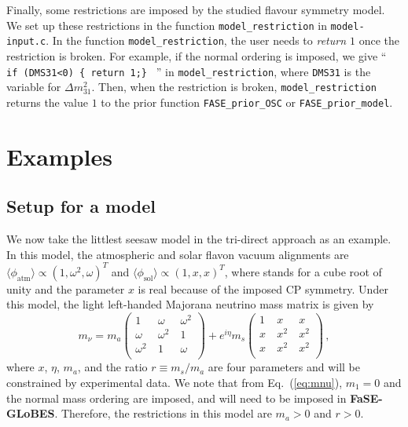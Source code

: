 \documentclass[aps,prd,nofootinbib,preprint]{revtex4}
\begin{document}
Finally, some restrictions are imposed by the studied flavour symmetry model. We set up these restrictions in the function \texttt{model\_restriction} in \texttt{model-input.c}. In the function \texttt{model\_restriction}, the user needs to \textit{return $1$} once the restriction is broken. For example, if the normal ordering is imposed, we give ``\texttt{ if (DMS31<0) \{ return 1;\} } '' in \texttt{model\_restriction}, where \texttt{DMS31} is the variable for $\Delta m_{31}^2$. Then, when the restriction is broken, \texttt{model\_restriction} returns the value $1$ to the prior function \texttt{FASE\_prior\_OSC} or \texttt{FASE\_prior\_model}. 


\section{Examples}
\subsection{Setup for a model}
We now take the littlest seesaw model in the tri-direct approach as an example. In this model, the atmospheric and solar flavon vacuum alignments are $\langle\phi_{\text{atm}}\rangle\propto\left(1, \omega^2, \omega\right)^T$ and $\langle\phi_{\text{sol}}\rangle\propto\left(1, x, x\right)^T$,
where  stands for a cube root of unity and the parameter $x$ is real because of the imposed CP symmetry. Under this model, the light left-handed Majorana neutrino mass matrix is given by
\begin{equation}
\label{eq:mnu}  m_{\nu}=m_{a}\begin{pmatrix}
 1 &~ \omega  &~ \omega ^2 \\
 \omega  &~ \omega ^2 &~ 1 \\
 \omega ^2 &~ 1 &~ \omega  \\
\end{pmatrix}+e^{i\eta}m_{s}
\begin{pmatrix}
 1 &~  x &~  x \\
 x &~ x^2 &~ x^2 \\
 x &~ x^2 &~ x^2 \\
\end{pmatrix}\,,
\end{equation}
where $x$, $\eta$, $m_a$, and the ratio $r\equiv m_s/m_a$ are four parameters and will be constrained by experimental data. We note that from Eq.~(\ref{eq:mnu}), $m_1=0$ and the normal mass ordering are imposed, and will need to be imposed in \textbf{FaSE-GLoBES}. Therefore, the restrictions in this model are $m_a>0$ and $r>0$.
\end{document}
